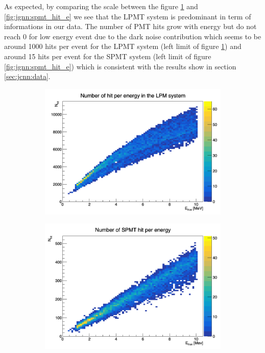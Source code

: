 \documentclass[../main.tex]{subfiles}
\begin{document}
As expected, by comparing the scale between the figure \ref{fig:jgnn:lpmt_hit_e} and \ref{fig:jgnn:spmt_hit_e} we see that the LPMT system is predominant in term of informations in our data. The number of PMT hits grow with energy but do not reach 0 for low energy event due to the dark noise contribution which seems to be around 1000 hits per event for the LPMT system (left limit of figure \ref{fig:jgnn:lpmt_hit_e}) and around 15 hits per event for the SPMT system (left limit of figure \ref{fig:jgnn:spmt_hit_e}) which is consistent with the results show in section \ref{sec:jcnn:data}.

\begin{figure}[ht]
  \centering
  \begin{subfigure}[t]{0.32\linewidth}
    \centering
    \includegraphics[width=\linewidth]{images/jgnn/lpmt_hit_e.png}
    \caption{}
    \label{fig:jgnn:lpmt_hit_e}
  \end{subfigure}
  \begin{subfigure}[t]{0.32\linewidth}
    \centering
    \includegraphics[width=\linewidth]{images/jgnn/spmt_hit_e.png}

\end{subfigure}
\end{figure}
\end{document}
